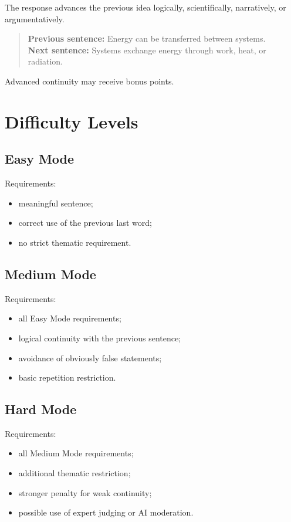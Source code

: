 \documentclass[11pt,a4paper]{article}
\begin{document}
The response advances the previous idea logically, scientifically, narratively, or argumentatively.

\begin{quote}
\textbf{Previous sentence:} Energy can be transferred between systems.\\
\textbf{Next sentence:} Systems exchange energy through work, heat, or radiation.
\end{quote}

Advanced continuity may receive bonus points.

\section{Difficulty Levels}

\subsection{Easy Mode}

Requirements:

\begin{itemize}
    \item meaningful sentence;
    \item correct use of the previous last word;
    \item no strict thematic requirement.
\end{itemize}

\subsection{Medium Mode}

Requirements:

\begin{itemize}
    \item all Easy Mode requirements;
    \item logical continuity with the previous sentence;
    \item avoidance of obviously false statements;
    \item basic repetition restriction.
\end{itemize}

\subsection{Hard Mode}

Requirements:

\begin{itemize}
    \item all Medium Mode requirements;
    \item additional thematic restriction;
    \item stronger penalty for weak continuity;
    \item possible use of expert judging or AI moderation.
\end{itemize}
\end{document}
